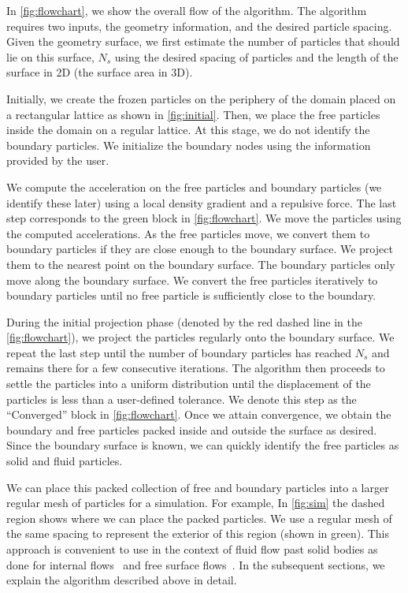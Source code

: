 \documentclass[preprint,12pt]{elsarticle}
\begin{document}
In \cref{fig:flowchart}, we show the overall flow of the algorithm. The
algorithm requires two inputs, the geometry information, and the desired
particle spacing. Given the geometry surface, we first estimate the number of
particles that should lie on this surface, $N_s$ using the desired spacing of
particles and the length of the surface in 2D (the surface area in 3D).

Initially, we create the frozen particles on the periphery of the domain placed on a rectangular lattice as shown in \cref{fig:initial}. Then, we place the free
particles inside the domain on a regular lattice. At this stage, we do not identify the boundary particles. We initialize the boundary nodes using the information provided by the user.

We compute the acceleration on the free particles and boundary particles (we
identify these later) using a local density gradient and a repulsive force.
The last step corresponds to the green block in \cref{fig:flowchart}. We move
the particles using the computed accelerations. As the free particles move, we
convert them to boundary particles if they are close enough to the boundary
surface. We project them to the nearest point on the boundary surface. The
boundary particles only move along the boundary surface. We convert the free
particles iteratively to boundary particles until no free particle is
sufficiently close to the boundary.

During the initial projection phase (denoted by the red dashed line in the
\cref{fig:flowchart}), we project the particles regularly onto the boundary
surface. We repeat the last step until the number of boundary particles has
reached $N_s$ and remains there for a few consecutive iterations. The
algorithm then proceeds to settle the particles into a uniform distribution
until the displacement of the particles is less than a user-defined
tolerance. We denote this step as the ``Converged'' block in
\cref{fig:flowchart}. Once we attain convergence, we obtain the boundary and
free particles packed inside and outside the surface as desired. Since the
boundary surface is known, we can quickly identify the free particles as solid
and fluid particles.

We can place this packed collection of free and boundary particles into a
larger regular mesh of particles for a simulation. For example, In
\cref{fig:sim} the dashed region shows where we can place the packed
particles. We use a regular mesh of the same spacing to represent the
exterior of this region (shown in green). This approach is convenient to use
in the context of fluid flow past solid bodies as done for internal
flows~\cite{negi2020improved} and free surface
flows~\cite{open_bc:tafuni:cmame:2018}. In the subsequent sections, we
explain the algorithm described above in detail.
\end{document}
